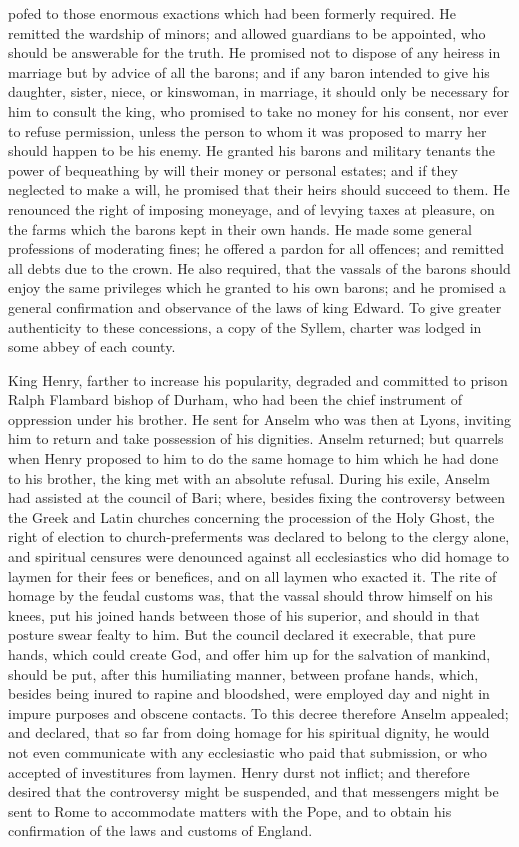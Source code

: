 \documentclass{article}
\begin{document}
pofed to those enormous exactions which had been formerly required. He remitted the wardship of minors; and allowed guardians to be appointed, who should be answerable for the truth. He promised not to dispose of any heiress in marriage but by advice of all the barons; and if any baron intended to give his daughter, sister, niece, or kinswoman, in marriage, it should only be necessary for him to consult the king, who promised to take no money for his consent, nor ever to refuse permission, unless the person to whom it was proposed to marry her should happen to be his enemy. He granted his barons and military tenants the power of bequeathing by will their money or personal estates; and if they neglected to make a will, he promised that their heirs should succeed to them. He renounced the right of imposing moneyage, and of levying taxes at pleasure, on the farms which the barons kept in their own hands. He made some general professions of moderating fines; he offered a pardon for all offences; and remitted all debts due to the crown. He also required, that the vassals of the barons should enjoy the same privileges which he granted to his own barons; and he promised a general confirmation and observance of the laws of king Edward. To give greater authenticity to these concessions, a copy of the Syllem, charter was lodged in some abbey of each county.

King Henry, farther to increase his popularity, degraded and committed to prison Ralph Flambard bishop of Durham, who had been the chief instrument of oppression under his brother. He sent for Anselm who was then at Lyons, inviting him to return and take possession of his dignities. Anselm returned; but quarrels when Henry proposed to him to do the same homage to him which he had done to his brother, the king met with an absolute refusal. During his exile, Anselm had assisted at the council of Bari; where, besides fixing the controversy between the Greek and Latin churches concerning the procession of the Holy Ghost, the right of election to church-preferments was declared to belong to the clergy alone, and spiritual censures were denounced against all ecclesiastics who did homage to laymen for their fees or benefices, and on all laymen who exacted it. The rite of homage by the feudal customs was, that the vassal should throw himself on his knees, put his joined hands between those of his superior, and should in that posture swear fealty to him. But the council declared it execrable, that pure hands, which could create God, and offer him up for the salvation of mankind, should be put, after this humiliating manner, between profane hands, which, besides being inured to rapine and bloodshed, were employed day and night in impure purposes and obscene contacts. To this decree therefore Anselm appealed; and declared, that so far from doing homage for his spiritual dignity, he would not even communicate with any ecclesiastic who paid that submission, or who accepted of investitures from laymen. Henry durst not inflict; and therefore desired that the controversy might be suspended, and that messengers might be sent to Rome to accommodate matters with the Pope, and to obtain his confirmation of the laws and customs of England.
\end{document}
